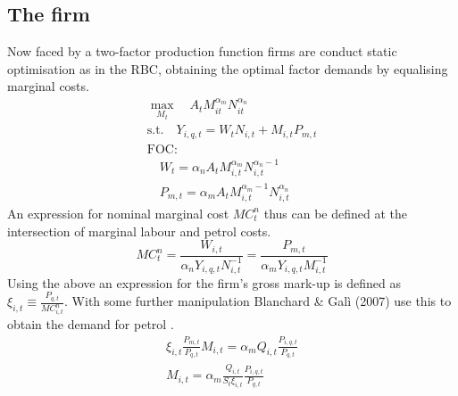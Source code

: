 \documentclass[12pt,a4paper,english]{article} %
\begin{document}
	\subsection{The firm}
	Now faced by a two-factor production function firms are conduct static optimisation as in the RBC, obtaining the optimal factor demands by equalising marginal costs.  
	\begin{equation}
		\begin{aligned}
			\max_{M_t} \quad A_t M_{it}^{\alpha_m} N_{it}^{\alpha_n} \\
			\textrm{s.t.} \quad Y_{i,q,t} = W_t N_{i,t} + M_{i,t} P_{m,t}\\
			\textrm{FOC:} \\
			\quad W_{t} = \alpha_n A_t M_{i,t}^{\alpha_m} N_{i,t}^{\alpha_n -1}\\
			\quad P_{m,t} = \alpha_m A_t M_{i,t}^{\alpha_m -1} N_{i,t}^{\alpha_n}
		\end{aligned}
	\end{equation}
	An expression for nominal marginal cost $MC_t^n$ thus can be defined at the intersection of marginal labour and petrol costs. 
	\begin{equation}
		MC_t^n = \frac{W_{i,t}}{\alpha_n Y_{i,q,t} N_{i,t}^{-1}} = \frac{P_{m,t}}{\alpha_m Y_{i,q,t} M_{i,t}^{-1}}
	\end{equation}
	Using the above an expression for the firm's gross mark-up is defined as $\xi_{i,t} \equiv \frac{P_{q,t}}{MC_{i,t}^n}$. With some further manipulation Blanchard \& Galì (2007) use this to obtain the demand for petrol \cite{blanchard_macroeconomic_2007}.
	\begin{equation}
		\begin{aligned}
		\xi_{i,t} \frac{P_{m,t}}{P_{q,t}} M_{i,t} = \alpha_m Q_{i,t} \frac{P_{i,q,t}}{P_{q,t}} \\
		M_{i,t} = \alpha_m \frac{Q_{i,t}}{S_t \xi_{i,t}} \frac{P_{i,q,t}}{P_{q,t}}
	\end{aligned}
	\end{equation}
\end{document}
